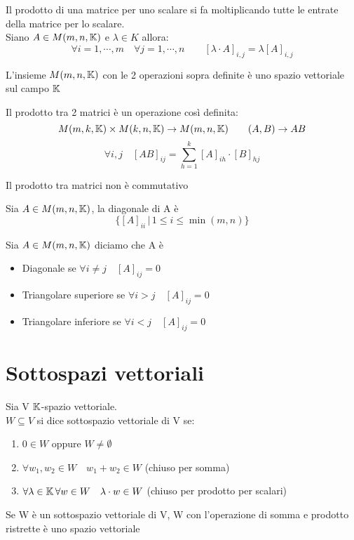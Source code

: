 \begin{defn}\bianco
Il prodotto di una matrice per uno scalare  si fa moltiplicando tutte le entrate della matrice per lo scalare.\\
Siano $A \in M(m,n,\mathbb{K})$ e $ \lambda \in K $ allora:
$$ \forall i= 1,\cdots ,m \quad \forall j=1,\cdots , n\qquad [\lambda \cdot A]_{i,j}=\lambda [A]_{i,j}$$ 
\end{defn}
\begin{prop}L'insieme $M(m,n,\mathbb{K})$ con le 2 operazioni sopra definite \`e uno spazio vettoriale sul campo $\mathbb{K}$
\end{prop}
\spazio
\begin{defn} \bianco
Il prodotto tra 2 matrici \`e un operazione cos\`i definita:
$$M(m,k,\mathbb{K})\times M(k,n,\mathbb{K})\to M(m,n,\mathbb{K})\qquad (A,B)\to AB$$ 
$$\forall i,j \quad [AB]_{ij}=\sum_{h=1}^k [A]_{ih}\cdot [B]_{hj}$$
\end{defn}
\begin{oss}Il prodotto tra matrici non \`e commutativo 
\end{oss}
\newpage

\begin{defn}[Diagonale ]\bianco Sia $ A \in M(m,n,\mathbb{K})$, la diagonale di A è
$$ \{ [A]_{ii} \, | \, 1 \leq i \leq \min(m,n) \} $$
\end{defn}
\begin{defn} Sia $ A \in M(m,n, \mathbb{K})$ diciamo che A \`e
\begin{itemize}
\item Diagonale se $ \forall i \neq j\quad [A]_{ij}=0$
\item Triangolare superiore se $ \forall i>j \quad [A]_{ij}=0$
\item Triangolare inferiore se $\forall i<j \quad [A]_{ij}=0$
\end{itemize}
\end{defn}

\newpage

\section{Sottospazi vettoriali}
\begin{defn}  Sia V $\mathbb{K}$-spazio vettoriale.\\ 
$ W \subseteq V $ si dice sottospazio vettoriale di V se:
\begin{enumerate}
\item $ 0 \in W $ oppure $ W \neq \emptyset$  
\item $\forall w_1, w_2 \in W \quad w_1+w_2 \in W $ (chiuso per somma)
\item $ \forall \lambda \in \mathbb{K} \, \forall	w \in W \quad \lambda \cdot w \in W $ (chiuso per prodotto per scalari)
\end{enumerate}
Se W è un sottospazio vettoriale di V, W con l'operazione di somma e prodotto ristrette è uno spazio vettoriale
\end{defn}


